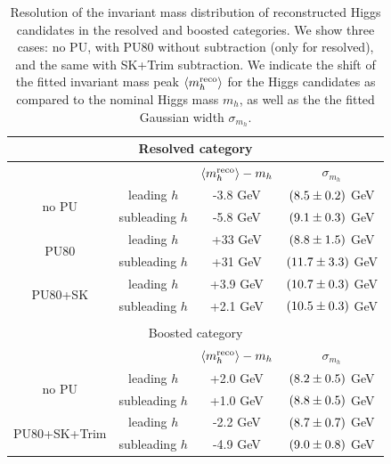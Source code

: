     \begin{table}[h]
      \centering
      \begin{tabular}{|c|c|c|c|}
        \hline
        \multicolumn{4}{|c|}{Resolved category}\\
        \hline
        \hline
        &   &   $\left\langle m_h^{\rm reco}\right\rangle-m_h$  &  $\sigma_{m_h}$  \\
              \hline
        \multirow{2}{*}{no PU}  & leading $h$  &  -3.8 GeV   & $\left( 8.5\pm 0.2\right)$ GeV   \\
          & subleading $h$   & -5.8 GeV  &  $\left( 9.1\pm 0.3\right)$ GeV \\
        \hline
          \multirow{2}{*}{PU80}  & leading $h$  &  +33 GeV   & $\left( 8.8\pm 1.5\right)$ GeV   \\
          & subleading $h$   & +31 GeV  &  $\left( 11.7\pm 3.3\right)$ GeV \\
          \hline
            \multirow{2}{*}{PU80+SK}  & leading $h$  &  +3.9 GeV   & $\left( 10.7\pm 0.3\right)$ GeV   \\
          & subleading $h$   & +2.1 GeV  &  $\left( 10.5\pm 0.3\right)$ GeV \\
            \hline
            \multicolumn{4}{c}{}\\
             \hline
        \multicolumn{4}{|c|}{Boosted category}\\
        \hline
        \hline
        &   &   $\left\langle m_h^{\rm reco}\right\rangle-m_h$  &  $\sigma_{m_h}$  \\
              \hline
        \multirow{2}{*}{no PU}  & leading $h$  &  +2.0 GeV   & $\left( 8.2\pm 0.5\right)$ GeV   \\
          & subleading $h$   & +1.0 GeV  &  $\left( 8.8\pm 0.5\right)$ GeV \\
        \hline
              \multirow{2}{*}{PU80+SK+Trim}  & leading $h$  &  -2.2 GeV   & $\left( 8.7\pm 0.7\right)$ GeV   \\
          & subleading $h$   & -4.9 GeV  &  $\left( 9.0\pm 0.8 \right)$ GeV \\
        \hline
        \end{tabular}
      \caption{\label{tab:massresolution}
        Resolution of the invariant mass distribution of
        reconstructed Higgs candidates in the resolved 
        and boosted  categories.
        We show three cases: no PU, with PU80
        without subtraction (only for resolved),
        and the same with SK+Trim subtraction.
        We indicate the shift of the fitted invariant
        mass peak $\left\langle m_h^{\rm reco}\right\rangle$ for
        the Higgs candidates as compared
        to the nominal Higgs mass $m_h$, as well as the
        the fitted  Gaussian  width  $\sigma_{m_h}$.
        }
    \end{table}



